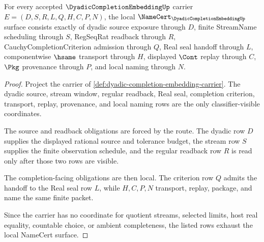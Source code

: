 \begin{theorem}
\label{thm:dyadic-completion-embedding-namecert-obligations}
For every accepted $\DyadicCompletionEmbeddingUp$ carrier $E=(D,S,R,L,Q,H,C,P,N)$, the local $\NameCert_{\DyadicCompletionEmbeddingUp}$ surface consists exactly of dyadic source exposure through $D$, finite StreamName scheduling through $S$, RegSeqRat readback through $R$, CauchyCompletionCriterion admission through $Q$, Real seal handoff through $L$, componentwise $\hsame$ transport through $H$, displayed $\Cont$ replay through $C$, $\Pkg$ provenance through $P$, and local naming through $N$.
\end{theorem}
\begin{proof}
Project the carrier of \autoref{def:dyadic-completion-embedding-carrier}. The dyadic source, stream window, regular readback, Real seal, completion criterion, transport, replay, provenance, and local naming rows are the only classifier-visible coordinates.

The source and readback obligations are forced by the route. The dyadic row $D$ supplies the displayed rational source and tolerance budget, the stream row $S$ supplies the finite observation schedule, and the regular readback row $R$ is read only after those two rows are visible.

The completion-facing obligations are then local. The criterion row $Q$ admits the handoff to the Real seal row $L$, while $H,C,P,N$ transport, replay, package, and name the same finite packet.

Since the carrier has no coordinate for quotient streams, selected limits, host real equality, countable choice, or ambient completeness, the listed rows exhaust the local NameCert surface.
\end{proof}

